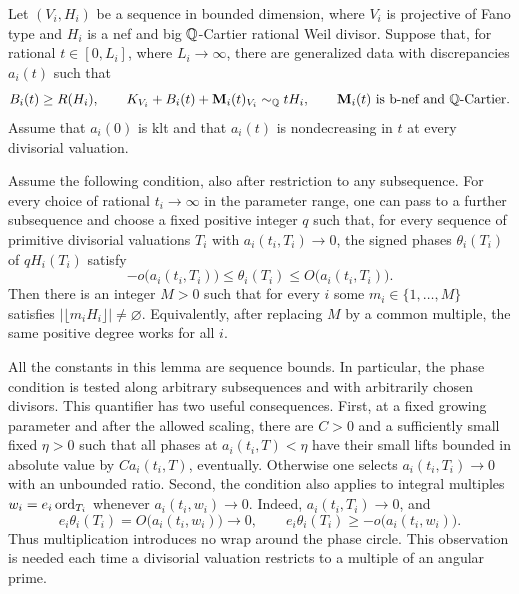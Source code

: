 \begin{lemma}\label{lem:B-phase-nonvanishing}
Let $(V_i,H_i)$ be a sequence in bounded dimension, where $V_i$ is
projective of Fano type and $H_i$ is a nef and big $\mathbb Q$-Cartier rational
Weil divisor.  Suppose that, for rational $t\in[0,L_i]$, where
$L_i\to\infty$, there are generalized data with discrepancies $a_i(t)$
such that
\begin{equation}\label{eq:B-family}
 B_i(t)\ge R(H_i),\qquad
 K_{V_i}+B_i(t)+\mathbf M_i(t)_{V_i}\sim_{\mathbb Q}tH_i,
 \qquad \mathbf M_i(t)\text{ is b-nef and $\mathbb Q$-Cartier}.
\end{equation}
Assume that $a_i(0)$ is klt and that $a_i(t)$ is nondecreasing in $t$
at every divisorial valuation.

Assume the following condition, also after restriction to any
subsequence.  For every choice of rational $t_i\to\infty$ in the
parameter range, one can pass to a further subsequence and choose a
fixed positive integer $q$ such that, for every sequence of primitive
divisorial valuations $T_i$ with $a_i(t_i,T_i)\to0$, the signed phases
$\theta_i(T_i)$ of $qH_i(T_i)$ satisfy
\begin{equation}\label{eq:B-phase-hypothesis}
 -o\bigl(a_i(t_i,T_i)\bigr)
 \le \theta_i(T_i)
 \le O\bigl(a_i(t_i,T_i)\bigr).
\end{equation}
Then there is an integer $M>0$ such that for every $i$ some
$m_i\in\{1,\ldots,M\}$ satisfies
$|\lfloor m_iH_i\rfloor|\ne\varnothing$.
Equivalently, after replacing $M$ by a common multiple, the same
positive degree works for all $i$.
\end{lemma}

All the constants in this lemma are sequence bounds.  In particular,
the phase condition is tested along arbitrary subsequences and with
arbitrarily chosen divisors.  This quantifier has two useful
consequences.  First, at a fixed growing parameter and after the
allowed scaling, there are $C>0$ and a sufficiently small fixed
$\eta>0$ such that all phases at $a_i(t_i,T)<\eta$ have their small
lifts bounded in absolute value by $Ca_i(t_i,T)$, eventually.
Otherwise one selects $a_i(t_i,T_i)\to0$ with an unbounded ratio.
Second, the condition also applies to integral multiples
$w_i=e_i\operatorname{ord}_{T_i}$ whenever $a_i(t_i,w_i)\to0$.  Indeed,
$a_i(t_i,T_i)\to0$, and
\begin{equation}\label{eq:B-multiple-phase}
 e_i\theta_i(T_i)=O\bigl(a_i(t_i,w_i)\bigr)\longrightarrow0,
 \qquad
 e_i\theta_i(T_i)\ge-o\bigl(a_i(t_i,w_i)\bigr).
\end{equation}
Thus multiplication introduces no wrap around the phase circle.  This
observation is needed each time a divisorial valuation restricts to a
multiple of an angular prime.

